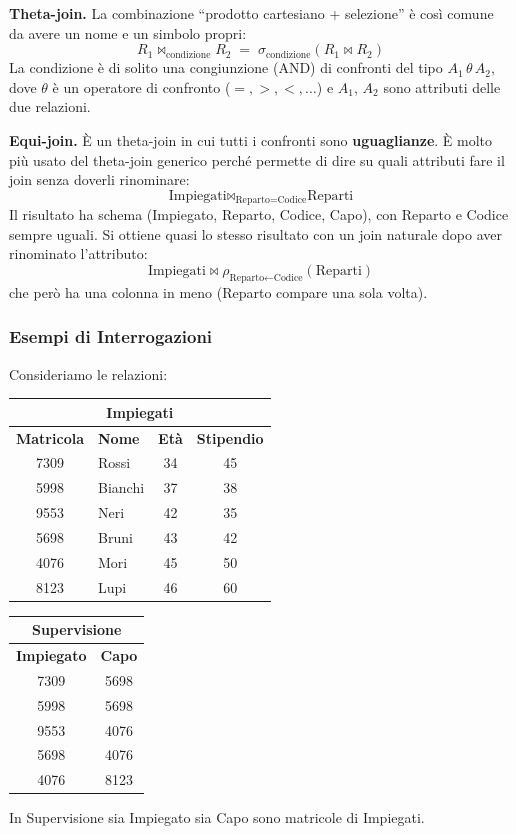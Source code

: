 \documentclass[12pt]{extarticle}
\begin{document}
\medskip
\noindent \textbf{Theta-join.} La combinazione ``prodotto cartesiano + selezione'' è così comune da avere un nome e un simbolo propri:
\[
R_1 \bowtie_{\text{condizione}} R_2 \;=\; \sigma_{\text{condizione}}(R_1 \bowtie R_2)
\]
La condizione è di solito una congiunzione (AND) di confronti del tipo $A_1 \,\theta\, A_2$, dove $\theta$ è un operatore di confronto ($=, >, <, \dots$) e $A_1$, $A_2$ sono attributi delle due relazioni.

\medskip
\noindent \textbf{Equi-join.} È un theta-join in cui tutti i confronti sono \textbf{uguaglianze}. È molto più usato del theta-join generico perché permette di dire su quali attributi fare il join senza doverli rinominare:
\[
\text{Impiegati} \bowtie_{\text{Reparto} = \text{Codice}} \text{Reparti}
\]
Il risultato ha schema (Impiegato, Reparto, Codice, Capo), con Reparto e Codice sempre uguali. Si ottiene quasi lo stesso risultato con un join naturale dopo aver rinominato l'attributo:
\[
\text{Impiegati} \bowtie \rho_{\text{Reparto} \leftarrow \text{Codice}}(\text{Reparti})
\]
che però ha una colonna in meno (Reparto compare una sola volta).

\subsubsection{Esempi di Interrogazioni}
\noindent Consideriamo le relazioni:
\begin{center}
\small
\begin{tabular}{clcc}
    \toprule
    \multicolumn{4}{c}{\textbf{Impiegati}} \\
    \midrule
    \textbf{Matricola} & \textbf{Nome} & \textbf{Età} & \textbf{Stipendio} \\
    \midrule
    7309 & Rossi & 34 & 45 \\
    5998 & Bianchi & 37 & 38 \\
    9553 & Neri & 42 & 35 \\
    5698 & Bruni & 43 & 42 \\
    4076 & Mori & 45 & 50 \\
    8123 & Lupi & 46 & 60 \\
    \bottomrule
\end{tabular}
\qquad
\begin{tabular}{cc}
    \toprule
    \multicolumn{2}{c}{\textbf{Supervisione}} \\
    \midrule
    \textbf{Impiegato} & \textbf{Capo} \\
    \midrule
    7309 & 5698 \\
    5998 & 5698 \\
    9553 & 4076 \\
    5698 & 4076 \\
    4076 & 8123 \\
    \bottomrule
\end{tabular}
\end{center}
In Supervisione sia Impiegato sia Capo sono matricole di Impiegati.
\end{document}
